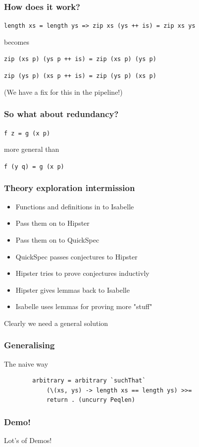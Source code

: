 \documentclass{beamer}
\begin{document}
\begin{frame}
    \frametitle{How does it work?}
        \centerline{\texttt{length xs = length ys => zip xs (ys ++ is) = zip xs ys}}
        \centerline{}
        \centerline{becomes}
        \centerline{}
        \centerline{\texttt{zip (xs p) (ys p ++ is) = zip (xs p) (ys p)}}
        \pause
        \centerline{}
        \centerline{\texttt{zip (ys p) (xs p ++ is) = zip (ys p) (xs p)}}
        \centerline{}
        \centerline{(We have a fix for this in the pipeline!)}
\end{frame}

\begin{frame}
    \frametitle{So what about redundancy?}
        \Large{\centerline{\texttt{f z = g (x p)}}}
        \centerline{}
        \centerline{more general than}
        \centerline{}
        \Large{\centerline{\texttt{f (y q) = g (x p)}}}
\end{frame}

\begin{frame}
    \frametitle{Theory exploration intermission}
    \begin{itemize}
        \item{Functions and definitions in to Isabelle}
        \item{Pass them on to Hipster}
        \item{Pass them on to QuickSpec}
        \item{QuickSpec passes conjectures to Hipster}
        \item{Hipster tries to prove conjectures inductivly}
        \item{Hipster gives lemmas back to Isabelle}
        \item{Isabelle uses lemmas for proving more "stuff"}
    \end{itemize}
    Clearly we need a general solution
\end{frame}

\begin{frame}[fragile]
    \frametitle{Generalising}
    \centerline{The naive way}
    \begin{verbatim}
        arbitrary = arbitrary `suchThat`
            (\(xs, ys) -> length xs == length ys) >>=
            return . (uncurry Peqlen) 
        \end{verbatim}   
\end{frame}

\begin{frame}
    \frametitle{Demo!}
        \Huge{\centerline{Lot's of Demos!}}
\end{frame}
\end{document}
